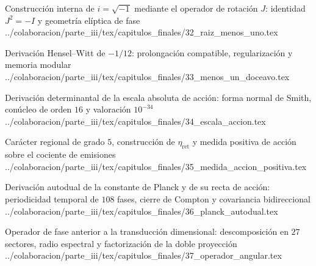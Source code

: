 \HMTFlushCurrentChapter
\HMTSuccessorChapterInput
  {Construcción interna de \texorpdfstring{\(i=\sqrt{-1}\)}{i=sqrt(-1)} mediante el operador de rotación \texorpdfstring{\(J\)}{J}: identidad \texorpdfstring{\(J^2=-I\)}{J2=-I} y geometría elíptica de fase}
  {../colaboracion/parte_iii/tex/capitulos_finales/32_raiz_menos_uno.tex}

\HMTFlushCurrentChapter
\HMTSuccessorChapterInput
  {Derivación Hensel--Witt de \texorpdfstring{\(-1/12\)}{-1/12}: prolongación compatible, regularización y memoria modular}
  {../colaboracion/parte_iii/tex/capitulos_finales/33_menos_un_doceavo.tex}

\HMTFlushCurrentChapter
\HMTSuccessorChapterInput
  {Derivación determinantal de la escala absoluta de acción: forma normal de Smith, conúcleo de orden \(16\) y valoración \texorpdfstring{\(10^{-34}\)}{10^-34}}
  {../colaboracion/parte_iii/tex/capitulos_finales/34_escala_accion.tex}


\HMTFlushCurrentChapter
\HMTSuccessorChapterInput
  {Carácter regional de grado \(5\), construcción de \texorpdfstring{\(\eta_{\mathrm{ret}}\)}{eta ret} y medida positiva de acción sobre el cociente de emisiones}
  {../colaboracion/parte_iii/tex/capitulos_finales/35_medida_accion_positiva.tex}


\HMTFlushCurrentChapter
\HMTSuccessorChapterInput
  {Derivación autodual de la constante de Planck y de su recta de acción: periodicidad temporal de \(108\) fases, cierre de Compton y covariancia bidireccional}
  {../colaboracion/parte_iii/tex/capitulos_finales/36_planck_autodual.tex}




\HMTFlushCurrentChapter
\HMTSuccessorChapterInput
  {Operador de fase anterior a la transducción dimensional: descomposición en \(27\) sectores, radio espectral y factorización de la doble proyección}
  {../colaboracion/parte_iii/tex/capitulos_finales/37_operador_angular.tex}

\HMTFlushCurrentChapter
